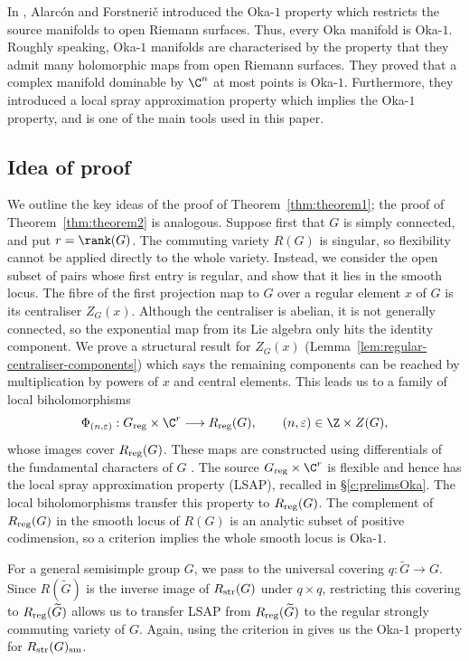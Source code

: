 \documentclass[12pt, a4paper, oneside]{amsart}
\theoremstyle{plain} %
\theoremstyle{definition} %
\theoremstyle{remark} %
\begin{document}
In \cite{AF25}, Alarc{\'o}n and Forstneri\v c introduced the Oka-$1$ property which restricts the source manifolds to open Riemann surfaces. Thus, every Oka manifold is Oka-$1$. Roughly speaking, Oka-$1$ manifolds are characterised by the property that they admit many holomorphic maps from open Riemann surfaces. They proved that a complex manifold dominable by $\C^n$ at most points is Oka-$1$. Furthermore, they introduced a local spray approximation property which implies the Oka-$1$ property, and is one of the main tools used in this paper.

\par
\endgroup
\makeatother

\makeatletter
\begingroup
\let\@tocwrite\@gobbletwo
\subsection*{Idea of proof}
We outline the key ideas of the proof of Theorem~\ref{thm:theorem1}; the proof of Theorem~\ref{thm:theorem2} is analogous. Suppose first that $G$ is simply connected, and put $r=\rank(G)$. The commuting variety $R(G)$ is singular, so flexibility cannot be applied directly to the whole variety. Instead, we consider the open subset of pairs whose first entry is regular, and show that it lies in the smooth locus. The fibre of the first projection map to $G$ over a regular element $x$ of $G$ is its centraliser $Z_G(x)$. Although the centraliser is abelian, it is not generally connected, so the exponential map from its Lie algebra only hits the identity component. We prove a structural result for $Z_G(x)$ (Lemma~\ref{lem:regular-centraliser-components}) which says the remaining components can be reached by multiplication by powers of $x$ and central elements. This leads us to a family of local biholomorphisms 
\[\Phi_{(n,\varepsilon)}:G_{\rm reg}\times\C^r
\longrightarrow R_{\rm reg}(G),
\qquad (n,\varepsilon)\in\Z\times Z(G),\]
whose images cover $R_{\rm reg}(G)$. These maps are constructed using differentials of the fundamental characters of $G$ \cite[\S 8]{Ste65}. The source $G_{\rm reg}\times \C^r$ is flexible and hence has the local spray approximation property (LSAP), recalled in \S\ref{c:prelimsOka}. The local biholomorphisms transfer this property to $R_{\rm reg}(G)$. The complement of $R_{\rm reg}(G)$ in the smooth locus of $R(G)$ is an analytic subset of positive codimension, so a criterion \cite[Proposition 7.13(b)]{AF25} implies the whole smooth locus is Oka-$1$.

For a general semisimple group $G$, we pass to the universal covering $q:\widetilde{G}\to G$. Since $R(\widetilde{G})$ is the inverse image of $R_{\rm str}(G)$ under $q\times q$, restricting this covering to $R_{\rm reg}(\widetilde{G})$ allows us to transfer LSAP from $R_{\rm reg}(\widetilde{G})$ to the regular strongly commuting variety of $G$. Again, using the criterion in \cite[Proposition 7.13(b)]{AF25} gives us the Oka-$1$ property for $R_{\rm str}(G)_{\rm sm}$.
\par
\endgroup
\makeatother
\end{document}
